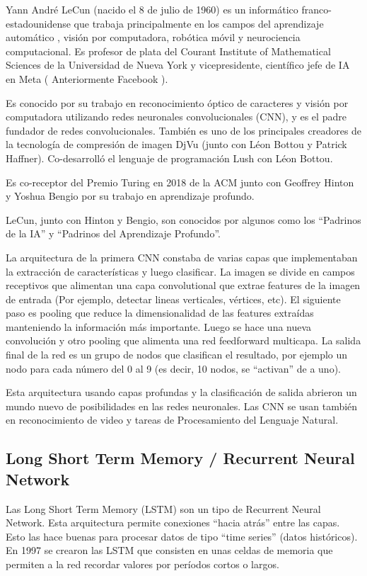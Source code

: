 \documentclass[a4paper]{article}
\begin{document}
Yann André LeCun (nacido el 8 de julio de 1960) es un informático franco-estadounidense que 
trabaja principalmente en los campos del aprendizaje automático , visión por computadora, 
robótica móvil y neurociencia computacional. Es profesor de plata del Courant Institute of 
Mathematical Sciences de la Universidad de Nueva York y vicepresidente, científico jefe de 
IA en Meta ( Anteriormente Facebook ).

Es conocido por su trabajo en reconocimiento óptico de caracteres y visión por computadora 
utilizando redes neuronales convolucionales (CNN), y es el padre fundador de redes 
convolucionales. También es uno de los principales creadores de la tecnología de compresión 
de imagen DjVu (junto con Léon Bottou y Patrick Haffner). Co-desarrolló el lenguaje de 
programación Lush con Léon Bottou.

Es co-receptor del Premio Turing en 2018 de la ACM junto con Geoffrey Hinton y Yoshua Bengio 
por su trabajo en aprendizaje profundo.

LeCun, junto con Hinton y Bengio, son conocidos por algunos como los ``Padrinos de la IA'' y 
``Padrinos del Aprendizaje Profundo''. 

La arquitectura de la primera CNN constaba de varias capas que implementaban la extracción 
de características y luego clasificar. La imagen se divide en campos receptivos que alimentan 
una capa convolutional que extrae features de la imagen de entrada (Por ejemplo, detectar 
lineas verticales, vértices, etc). El siguiente paso es pooling que reduce la dimensionalidad 
de las features extraídas manteniendo la información más importante. Luego se hace una nueva 
convolución y otro pooling que alimenta una red feedforward multicapa. La salida final de la 
red es un grupo de nodos que clasifican el resultado, por ejemplo un nodo para cada número 
del 0 al 9 (es decir, 10 nodos, se ``activan'' de a uno).

Esta arquitectura usando capas profundas y la clasificación de salida abrieron un mundo nuevo 
de posibilidades en las redes neuronales. Las CNN se usan también en reconocimiento de video 
y tareas de Procesamiento del Lenguaje Natural. 

\subsection{Long Short Term Memory / Recurrent Neural Network}
Las Long Short Term Memory (LSTM) son un tipo de Recurrent Neural Network. Esta arquitectura permite 
conexiones ``hacia atrás'' entre las capas. Esto las hace buenas para procesar datos de tipo 
``time series'' (datos históricos). En 1997 se crearon las LSTM que consisten en unas celdas 
de memoria que permiten a la red recordar valores por períodos cortos o largos.
\end{document}
